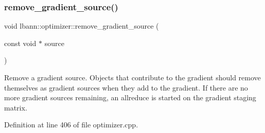 \subsubsection{\texorpdfstring{remove\+\_\+gradient\+\_\+source()}{remove\_gradient\_source()}}
{\footnotesize\ttfamily void lbann\+::optimizer\+::remove\+\_\+gradient\+\_\+source (\begin{DoxyParamCaption}\item[{const void $\ast$}]{source }\end{DoxyParamCaption})}

Remove a gradient source. Objects that contribute to the gradient should remove themselves as gradient sources when they add to the gradient. If there are no more gradient sources remaining, an allreduce is started on the gradient staging matrix. 

Definition at line 406 of file optimizer.\+cpp.


